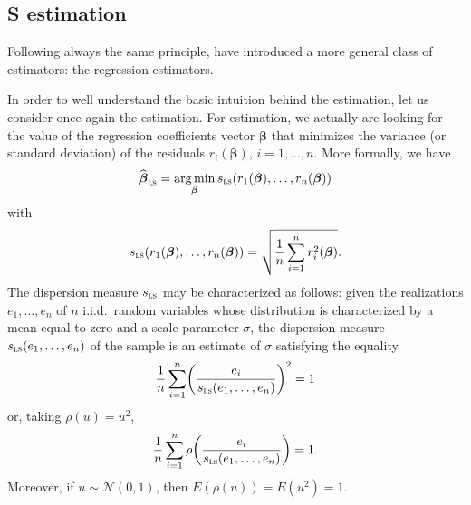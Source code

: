 \subsection{S estimation}

Following always the same principle, \citet{rousseeuw:yohai:1984} have
introduced a more general class of estimators: the regression
 estimators.

In order to well understand the basic intuition behind the  estimation,
let us consider once again the  estimation. For  estimation,
we actually are looking for the value of the regression coefficients vector
$\boldsymbol{\beta}$ that minimizes the variance (or standard deviation) of the
residuals $r_{i}(\boldsymbol\beta)$, $i = 1, \dots, n$. More formally, we have
\[
    \sthat{\boldsymbol\beta}_{\stsc{LS}} 
    = \argmin_{\boldsymbol\beta} s_{\stsc{LS}}(r_{1}(\boldsymbol\beta), \dots, r_{n}(\boldsymbol\beta))
\]
with
\[
    s_{\stsc{LS}}(r_{1}(\boldsymbol\beta), \dots, r_{n}(\boldsymbol\beta)) 
    = \sqrt{\frac{1}{n}\sum_{i=1}^{n} r_{i}^{2}(\boldsymbol\beta)}.
\]
The dispersion measure $s_{\stsc{LS}}$ may be characterized as follows: given
the realizations $e_{1}, \dots, e_{n}$ of $n$ i.i.d.\ random variables whose
distribution is characterized by a mean equal to zero and a scale parameter
$\sigma$, the dispersion measure $s_{\stsc{LS}}(e_{1}, \dots, e_{n})$ of the
sample is an estimate of $\sigma$ satisfying the equality
\[
    \frac{1}{n}\sum_{i=1}^{n} \left(\frac{e_{i}}{s_{\stsc{LS}}(e_{1}, \dots, e_{n})}\right)^{2} = 1
\]
or, taking $\rho(u) = u^{2}$,
\[
    \frac{1}{n}\sum_{i=1}^{n} \rho\left(\frac{e_{i}}{s_{\stsc{LS}}(e_{1}, \dots, e_{n})}\right) = 1.
\]
Moreover, if $u \sim \mathcal{N}(0,1)$, then $E(\rho(u)) = E(u^{2}) = 1$.

